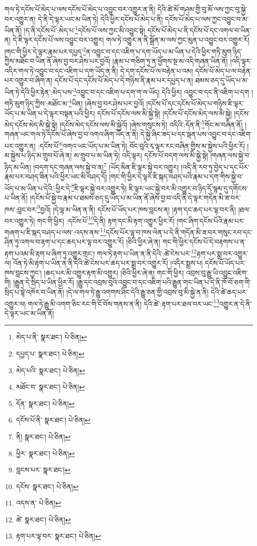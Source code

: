 གལ་ཏེ་དངོས་པོ་མེད་པ་ལས་དངོས་པོ་མེད་པ་འབྱུང་བར་འགྱུར་ན་ནི། དེའི་ཚེ་མོ་གཤམ་གྱི་བུ་མོ་ལས་ཀྱང་བུ་སྐྱེ་བར་འགྱུར་ན། དེ་ནི་དེ་ལྟར་ཡང་མ་ཡིན་ཏེ། དེའི་ཕྱིར་དངོས་པོ་མེད་པ་ནི། དངོས་པོ་མེད་པ་ལས་ཀྱང་འབྱུང་བ་མ་ཡིན་ནོ། །ད་ནི་དངོས་པོ་:མེད་པ་\footnote{མེད་པ་ནི་  སྣར་ཐང་།  པེ་ཅིན། }དངོས་པོ་ལས་ཀྱང་མི་འབྱུང་སྟེ། དངོས་པོ་མེད་པ་ནི་དངོས་པོ་དང་འགལ་བ་ཡིན་ན། དེ་ཇི་ལྟར་དངོས་པོ་ལས་འབྱུང་བར་འགྱུར། གལ་ཏེ་འགྱུར་ན་ནི་སྒྲོན་མ་ལས་ཀྱང་མུན་པ་འབྱུང་བར་འགྱུར་རོ། །གང་གི་ཕྱིར་དེ་ལྟར་རྣམ་པར་དཔྱད་\footnote{དཔྱད་པ་  སྣར་ཐང་།  པེ་ཅིན། }ན་འབྱུང་བ་དང་འཇིག་པ་དག་ཡོད་པ་མ་ཡིན་པ་དེའི་ཕྱིར་གཏི་མུག་ཉིད་ཀྱིས་མཐོང་བ་ཡིན་ནོ་ཞེས་བྱ་བར་ཤེས་པར་བྱའོ། །རྣམ་པ་གཅིག་ཏུ་ན་ཕྱོགས་སྔ་མ་འདི་གཞན་ཡིན་ནོ། །འདི་ལྟར་འདིར་གལ་ཏེ་འབྱུང་བ་དང་འཇིག་པ་དག་ཡོད་ན་ནི། དེ་དག་དངོས་པོ་ལ་བརྟེན་པ་འམ། དངོས་པོ་མེད་པ་ལ་བརྟེན་པར་འགྱུར་བ་ཞིག་ན། དངོས་པོ་དང་དངོས་པོ་མེད་པ་དེ་གཉིས་ནི་རྣམ་པར་དཔྱད་པ་ན། ཐམས་ཅད་དུ་ཡོད་པ་མ་ཡིན་ཏེ་དེའི་ཕྱིར་རྟེན་:མེད་པས་\footnote{མེད་པའི་  སྣར་ཐང་།  པེ་ཅིན། }འབྱུང་བ་དང་འཇིག་པ་དག་ག་ལ་ཡོད། དེའི་ཕྱིར། འབྱུང་བ་དང་ནི་འཇིག་པ་དག །གཏི་མུག་ཉིད་ཀྱིས་:མཐོང་མ་\footnote{མཐོང་བ་  སྣར་ཐང་།  པེ་ཅིན། }ཡིན། །ཞེས་བྱ་བར་ཤེས་པར་བྱའོ། །དངོས་པོ་དང་དངོས་པོ་མེད་པ་གཉིས་ཇི་ལྟར་ཡོད་པ་མ་ཡིན་པ་དེ་ལྟར་བསྟན་པའི་ཕྱིར། དངོས་པོ་དངོས་ལས་མི་སྐྱེ་སྟེ། །དངོས་པོ་དངོས་མེད་ལས་མི་སྐྱེ། །དངོས་མེད་དངོས་མེད་མི་སྐྱེ་སྟེ། །དངོས་མེད་དངོས་ལས་མི་སྐྱེའོ། །ཞེས་གསུངས་ཏེ། འདིའི་:དོན་ནི་\footnote{དོན་  སྣར་ཐང་།  པེ་ཅིན། }གོང་མ་བཞིན་ནོ། །གཞན་ཡང་གལ་ཏེ་དངོས་པོ་ཞེས་བྱ་བ་འགའ་ཞིག་ཡོད་ན་ནི། དེ་སྐྱེ་ཞིང་ཟད་པ་དང་ལྡན་པས་འབྱུང་བ་དང་འཇིག་པར་འགྱུར་ན། :དངོས་པོ་\footnote{དངོས་པོ་ནི་  སྣར་ཐང་།  པེ་ཅིན། }འགའ་ཡང་ཡོད་པ་མ་ཡིན་ཏེ། བོང་བུའི་རྭ་ལྟར་རང་བཞིན་གྱིས་མ་སྐྱེས་པའི་ཕྱིར་རོ། །མ་སྐྱེས་པ་ཉིད་མ་གྲུབ་པོ་ཞེ་ན། མ་གྲུབ་པ་མ་ཡིན་ཏེ། འདི་ལྟར། དངོས་པོ་བདག་ལས་མི་སྐྱེ་སྟེ། །གཞན་ལས་སྐྱེ་བ་ཉིད་མ་ཡིན། །བདག་དང་གཞན་ལས་སྐྱེ་བ་ན།\footnote{ནི།  སྣར་ཐང་།  པེ་ཅིན། } །ཡོད་མིན་ཇི་ལྟར་སྐྱེ་བར་འགྱུར། །འདི་ནི་རབ་ཏུ་བྱེད་པ་དང་པོར་རྣམ་པར་བཤད་ཟིན་པའི་ཕྱིར་ཡང་མི་བཤད་དོ། །གང་གི་ཕྱིར་དེ་ལྟར་ཇི་སྐད་བཤད་པའི་རྣམ་པ་དག་གིས་སྐྱེ་བ་ཡོད་པ་མ་ཡིན་པ་དེའི་:ཕྱིར་དེ་\footnote{ཕྱིར་  སྣར་ཐང་།  པེ་ཅིན། }ཇི་ལྟར་སྐྱེ་བར་འགྱུར་ཏེ། ཇི་ལྟར་ཡང་སྐྱེ་བར་མི་འགྱུར་བ་ཉིད་དོ་སྙམ་དུ་དགོངས་པ་ཡིན་ནོ། །དངོས་པོ་སྐྱེ་བ་རྣམ་པ་ཐམས་ཅད་དུ་ཡོད་པ་མ་ཡིན་ནོ་ཞེས་བྱ་བ་འདི་ནི་དེ་ལྟར་གདོན་མི་ཟ་བར་ཁས་:བླང་བར་\footnote{བླངས་པར་  སྣར་ཐང་། }བྱའོ། །དེ་ལྟ་མ་ཡིན་ན་ནི། དངོས་པོ་ཡོད་པར་ཁས་བླངས་ན། །རྟག་དང་ཆད་པར་ལྟ་བར་ནི། །ཐལ་བར་འགྱུར་ཏེ། གང་གི་ཕྱིར། :དངོས་པོ་\footnote{དངོས་  སྣར་ཐང་།  པེ་ཅིན། }དེ་ནི། རྟག་དང་མི་རྟག་འགྱུར་ཕྱིར་རོ། །གང་ཞིག་དངོས་པོའི་རྣམ་པར་གཞག་པ་ཇི་སྐད་བཤད་པ་ལས་:འདས་ནས་\footnote{འདས་ན་  པེ་ཅིན། }དངོས་པོར་ལྟ་བ་ཁས་ལེན་པ་དེ་ནི་གདོན་མི་ཟ་བར་གསུང་རབ་དང་ཤིན་ཏུ་འགལ་བ་རྟག་པ་དང་ཆད་པར་ལྟ་བར་འགྱུར་རོ། །ཅིའི་ཕྱིར་ཞེ་ན། གང་གི་ཕྱིར་དངོས་པོ་དེ་བརྟགས་པ་ན་རྟག་པའམ་མི་རྟག་པ་ཞིག་ཏུ་འགྱུར་གྲང་། གལ་ཏེ་རྟག་པ་ཡིན་ན་ནི་དེའི་:ཚེ་ངེས་པར་\footnote{ཚེ་  སྣར་ཐང་།  པེ་ཅིན། }རྟག་པར་སྨྲ་བར་འགྱུར་ལ། འོན་ཏེ་མི་རྟག་པ་ཡིན་ན་ནི་དེའི་ཚེ་ངེས་པར་ཆད་པར་སྨྲ་བར་འགྱུར་རོ། །འདིར་སྨྲས་པ། དངོས་པོ་ཡོད་པར་ཁས་བླངས་ཀྱང་། །ཆད་པར་མི་འགྱུར་རྟག་མི་འགྱུར། །ཅིའི་ཕྱིར་ཞེ་ན། གང་གི་ཕྱིར། འབྲས་བུ་རྒྱུ་ཡི་འབྱུང་འཇིག་གི། །རྒྱུན་དེ་སྲིད་པ་ཡིན་ཕྱིར་རོ། །རྒྱུ་དང་འབྲས་བུའི་འབྱུང་བ་དང་འཇིག་པའི་རྒྱུན་གང་ཡིན་པ་དེ་ནི་ཁོ་བོ་ཅག་གི་སྲིད་པ་སྟེ་འཁོར་བ་ཡིན་ནོ། །དེ་ལ་གལ་ཏེ་རྒྱུ་འགགས་ཤིང་དེའི་རྒྱུ་ཅན་གྱི་འབྲས་བུ་མི་སྐྱེ་ན་ནི། དེའི་ཚེ་ཆད་པར་འགྱུར་ལ། གལ་ཏེ་རྒྱུ་མི་འགག་ཅིང་རང་གི་ངོ་བོས་གནས་ན་ནི། དེའི་ཚེ་:རྟག་པར་ཐལ་བར་ཡང་\footnote{རྟག་པར་ལྟ་བར་  སྣར་ཐང་།  པེ་ཅིན། }འགྱུར་ན་དེ་ནི་དེ་ལྟར་ཡང་མ་ཡིན་ནོ། 